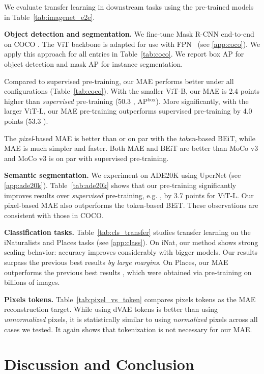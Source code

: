 We evaluate transfer learning in downstream tasks using the pre-trained models in Table~\ref{tab:imagenet_e2e}.

\textbf{Object detection and segmentation.} We fine-tune Mask R-CNN \cite{He2017} end-to-end on COCO \cite{Lin2014}. The ViT backbone is adapted for use with FPN~\cite{Lin2017} (see \ref{app:coco}). We apply this approach for all entries in Table~\ref{tab:coco}. We report box AP for object detection and mask AP for instance segmentation.

Compared to supervised pre-training, our MAE performs better under all configurations (Table~\ref{tab:coco}). With the smaller ViT-B, our MAE is 2.4 points higher than \textit{supervised} pre-training (50.3 , AP$^\text{box}$). More significantly, with the larger ViT-L, our MAE pre-training outperforms supervised pre-training by 4.0 points (53.3 ).

The \textit{pixel}-based MAE is better than or on par with the \textit{token}-based BEiT, while MAE is much simpler and faster. Both MAE and BEiT are better than MoCo v3 and MoCo v3 is on par with supervised pre-training.

\textbf{Semantic segmentation.} We experiment on ADE20K \cite{Zhou2019} using UperNet \cite{Xiao2018} (see \ref{app:ade20k}). Table~\ref{tab:ade20k} shows that our pre-training significantly improves results over \textit{supervised} pre-training, e.g. , by 3.7 points for ViT-L. Our pixel-based MAE also outperforms the token-based BEiT. These observations are consistent with those in COCO.

\textbf{Classification tasks.} \mbox{Table~\ref{tab:cls_transfer}} studies transfer learning on the iNaturalists \cite{VanHorn2018} and Places \cite{Zhou2014} tasks (see \ref{app:class}). On iNat, our method shows strong scaling behavior: accuracy improves considerably with bigger models. Our results surpass the previous best results \textit{by large margins}. On Places, our MAE outperforms the previous best results \cite{Goyal2021,Mahajan2018}, which were obtained via pre-training on billions of images.

\textbf{Pixels \vs tokens.} Table~\ref{tab:pixel_vs_token} compares pixels \vs tokens as the MAE reconstruction target. While using dVAE tokens is better than using \textit{unnormalized} pixels, it is statistically similar to using \textit{normalized} pixels across all cases we tested. It again shows that tokenization is not necessary for our MAE.

\section{Discussion and Conclusion}

